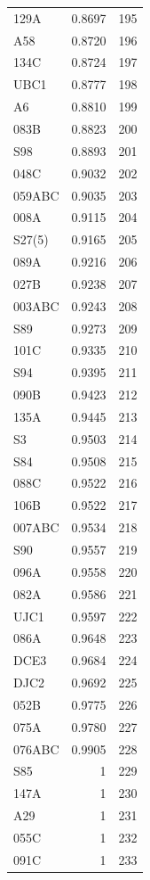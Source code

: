 \begin{longtable}{lrr}
  129A & 0.8697 & 195 \\
  A58 & 0.8720 & 196 \\
  134C & 0.8724 & 197 \\
  UBC1 & 0.8777 & 198 \\
  A6 & 0.8810 & 199 \\
  083B & 0.8823 & 200 \\
  S98 & 0.8893 & 201 \\
  048C & 0.9032 & 202 \\
  059ABC & 0.9035 & 203 \\
  008A & 0.9115 & 204 \\
  S27(5) & 0.9165 & 205 \\
  089A & 0.9216 & 206 \\
  027B & 0.9238 & 207 \\
  003ABC & 0.9243 & 208 \\
  S89 & 0.9273 & 209 \\
  101C & 0.9335 & 210 \\
  S94 & 0.9395 & 211 \\
  090B & 0.9423 & 212 \\
  135A & 0.9445 & 213 \\
  S3 & 0.9503 & 214 \\
  S84 & 0.9508 & 215 \\
  088C & 0.9522 & 216 \\
  106B & 0.9522 & 217 \\
  007ABC & 0.9534 & 218 \\
  S90 & 0.9557 & 219 \\
  096A & 0.9558 & 220 \\
  082A & 0.9586 & 221 \\
  UJC1 & 0.9597 & 222 \\
  086A & 0.9648 & 223 \\
  DCE3 & 0.9684 & 224 \\
  DJC2 & 0.9692 & 225 \\
  052B & 0.9775 & 226 \\
  075A & 0.9780 & 227 \\
  076ABC & 0.9905 & 228 \\
  S85 & 1 & 229 \\
  147A & 1 & 230 \\
  A29 & 1 & 231 \\
  055C & 1 & 232 \\
  091C & 1 & 233 \\
\end{longtable}
